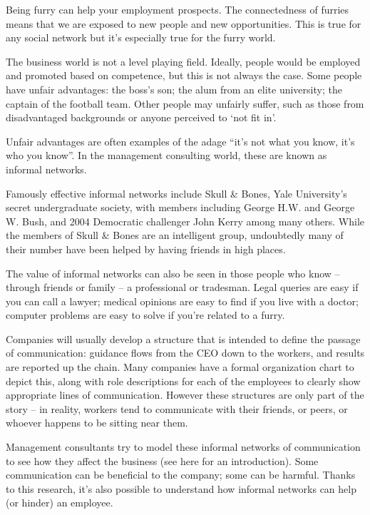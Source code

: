 
Being furry can help your employment prospects. The connectedness of furries means that we are exposed to new people and new opportunities. This is true for any social network but it's especially true for the furry world.

The business world is not a level playing field. Ideally, people would be employed and promoted based on competence, but this is not always the case. Some people have unfair advantages: the boss's son; the alum from an elite university; the captain of the football team. Other people may unfairly suffer, such as those from disadvantaged backgrounds or anyone perceived to `not fit in'.

Unfair advantages are often examples of the adage ``it's not what you know, it's who you know''. In the management consulting world, these are known as informal networks.

Famously effective informal networks include Skull \& Bones, Yale University's secret undergraduate society, with members including George H.W. and George W. Bush, and 2004 Democratic challenger John Kerry among many others. While the members of Skull \& Bones are an intelligent group, undoubtedly many of their number have been helped by having friends in high places.

The value of informal networks can also be seen in those people who know -- through friends or family -- a professional or tradesman. Legal queries are easy if you can call a lawyer; medical opinions are easy to find if you live with a doctor; computer problems are easy to solve if you're related to a furry.

Companies will usually develop a structure that is intended to define the passage of communication: guidance flows from the CEO down to the workers, and results are reported up the chain. Many companies have a formal organization chart to depict this, along with role descriptions for each of the employees to clearly show appropriate lines of communication. However these structures are only part of the story -- in reality, workers tend to communicate with their friends, or peers, or whoever happens to be sitting near them.

Management consultants try to model these informal networks of communication to see how they affect the business (see here for an introduction). Some communication can be beneficial to the company; some can be harmful. Thanks to this research, it's also possible to understand how informal networks can help (or hinder) an employee.


